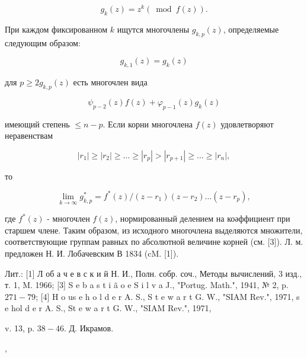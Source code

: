 \documentclass[10pt]{article}
\begin{document}
\[

g_{k}(z)=z^{k}(\bmod f(z)) .

\]



При каждом фиксированном $k$ ищутся многочлены $g_{k, p}(z)$, определяемые следующим образом:



\[

g_{k, 1}(z)=g_{k}(z)

\]



для $p \geqslant 2 g_{k, p}(z)$ есть многочлен вида



\[

\psi_{p-2}(z) f(z)+\varphi_{p-1}(z) g_{k}(z)

\]



имеющий степень $\leqslant n-p$. Если корни многочлена $f(z)$ удовлетворяют неравенствам



\[

\left|r_{1}\right| \geqslant\left|r_{2}\right| \geqslant \ldots \geqslant\left|r_{p}\right|>\left|r_{p+1}\right| \geqslant \ldots \geqslant\left|r_{n}\right|,

\]



то



\[

\lim _{k \rightarrow \infty} g_{k, p}^{*}=f^{*}(z) /\left(z-r_{1}\right)\left(z-r_{2}\right) \ldots\left(z-r_{p}\right),

\]



где $f^{*}(z)$ - многочлен $f(z)$, нормированный делением на коәффициент при старшем члене. Таким образом, из исходного многочлена выделяются множители, соответствующие группам равных по абсолютной величине корней (см. [3]). Л. м. предложен Н. И. Лобачевским В 1834 (cM. [1]).



Лит.: [1] Л об а ч е в с к и й Н. И., Полн. собр. соч., Методы вычислений, 3 изд., т. 1, M. 1966; [3] S e b a s t i ã o e S i l v a J., "Portug. Math.", 1941, № 2, p. $271-79$; [4] H o us e h o l d e r A. S., S t e w a r t G. W., "SIAM Rev.", 1971, s e hol d e r A. S., St e w a r t G. W., "SIAM Rev.", 1971,

v. 13, p. $38-46$. Д. Икрамов.

,
\end{document}
